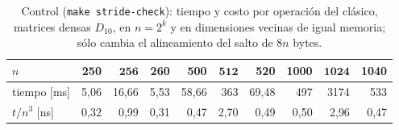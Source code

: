 %
\begin{table}[H]
\centering
\small
\caption{Control (\texttt{make stride-check}): tiempo y costo por operación del clásico, matrices densas $D_{10}$, en $n=2^{k}$ y en dimensiones vecinas de igual memoria; sólo cambia el alineamiento del salto de $8n$ bytes.}
\label{tab:matrix-stride}
\begin{tabular}{lrrrrrrrrr}
\hline\hline
$n$ & 250 & $\mathbf{256}$ & 260 & 500 & $\mathbf{512}$ & 520 & 1000 & $\mathbf{1024}$ & 1040 \\
\hline
tiempo [ms] & 5{,}06 & 16{,}66 & 5{,}53 & 58{,}66 & 363 & 69{,}48 & 497 & 3174 & 533 \\
$t/n^{3}$ [ns] & 0{,}32 & 0{,}99 & 0{,}31 & 0{,}47 & 2{,}70 & 0{,}49 & 0{,}50 & 2{,}96 & 0{,}47 \\
\hline\hline
\end{tabular}
\end{table}
